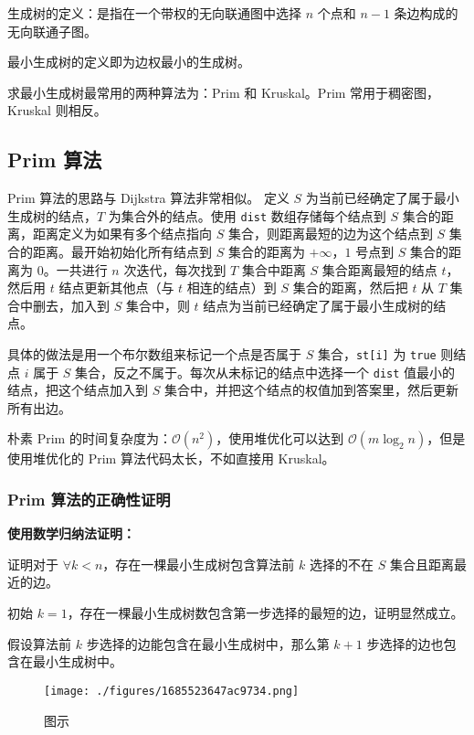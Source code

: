 

生成树的定义：是指在一个带权的无向联通图中选择 $n$ 个点和 $n - 1$ 条边构成的无向联通子图。

最小生成树的定义即为边权最小的生成树。

求最小生成树最常用的两种算法为：Prim 和 Kruskal。Prim 常用于稠密图，Kruskal 则相反。

\subsection{Prim 算法}

Prim 算法的思路与 Dijkstra 算法非常相似。
定义 $S$ 为当前已经确定了属于最小生成树的结点，$T$ 为集合外的结点。使用 \verb`dist` 数组存储每个结点到 $S$ 集合的距离，距离定义为如果有多个结点指向 $S$ 集合，则距离最短的边为这个结点到 $S$ 集合的距离。最开始初始化所有结点到 $S$ 集合的距离为 $+\infty$，$1$ 号点到 $S$ 集合的距离为 $0$。一共进行 $n$ 次迭代，每次找到 $T$ 集合中距离 $S$ 集合距离最短的结点 $t$，然后用 $t$ 结点更新其他点（与 $t$ 相连的结点）到 $S$ 集合的距离，然后把 $t$ 从 $T$ 集合中删去，加入到 $S$ 集合中，则 $t$ 结点为当前已经确定了属于最小生成树的结点。

具体的做法是用一个布尔数组来标记一个点是否属于 $S$ 集合，\verb`st[i]` 为 \verb`true` 则结点 $i$ 属于 $S$ 集合，反之不属于。每次从未标记的结点中选择一个 \verb`dist` 值最小的结点，把这个结点加入到 $S$ 集合中，并把这个结点的权值加到答案里，然后更新所有出边。

朴素 Prim 的时间复杂度为：$\mathcal{O}(n^2)$，使用堆优化可以达到 $\mathcal{O}(m \log_2 n)$，但是使用堆优化的 Prim 算法代码太长，不如直接用 Kruskal。

\subsubsection{Prim 算法的正确性证明}

\textbf{使用数学归纳法证明：}

证明对于 $\forall k < n$，存在一棵最小生成树包含算法前 $k$ 选择的不在 $S$ 集合且距离最近的边。

初始 $k = 1$，存在一棵最小生成树数包含第一步选择的最短的边，证明显然成立。

假设算法前 $k$ 步选择的边能包含在最小生成树中，那么第 $k + 1$ 步选择的边也包含在最小生成树中。

\begin{figure}[ht]
\centering
\texttt{[image: ./figures/1685523647ac9734.png]}
\caption{图示} \label{fig_Prim_1}
\end{figure}

